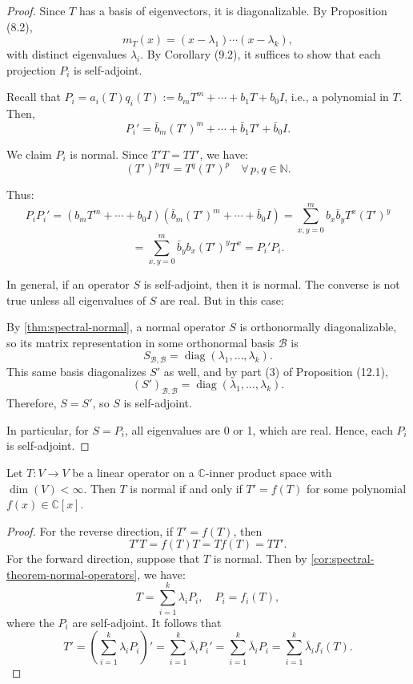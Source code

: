 \begin{proof} Since \( T \) has a basis of eigenvectors, it is diagonalizable. By Proposition (8.2),
\[
m_T(x) = (x - \lambda_1) \cdots (x - \lambda_k),
\]
with distinct eigenvalues \( \lambda_i \). By Corollary (9.2), it suffices to show that each projection \( P_i \) is self-adjoint.

Recall that \( P_i = a_i(T) q_i(T) := b_m T^m + \cdots + b_1 T + b_0 I \), i.e., a polynomial in \( T \). Then,
\[
P_i' = \bar{b}_m (T')^m + \cdots + \bar{b}_1 T' + \bar{b}_0 I.
\]

We claim \( P_i \) is normal. Since \( T'T = TT' \), we have:
\[
(T')^p T^q = T^q (T')^p \quad \forall\, p, q \in \mathbb{N}.
\]

Thus:
\[
P_i P_i' = \left( b_m T^m + \cdots + b_0 I \right) \left( \bar{b}_m (T')^m + \cdots + \bar{b}_0 I \right)
= \sum_{x,y=0}^m b_x \bar{b}_y T^x (T')^y
\]
\[
= \sum_{x,y=0}^m \bar{b}_y b_x (T')^y T^x = P_i' P_i.
\]

In general, if an operator \( S \) is self-adjoint, then it is normal. The converse is not true unless all eigenvalues of \( S \) are real. But in this case:

By \autoref{thm:spectral-normal}, a normal operator \( S \) is orthonormally diagonalizable, so its matrix representation in some orthonormal basis \( \mathcal{B} \) is
\[
S_{\mathcal{B}, \mathcal{B}} = \operatorname{diag}(\lambda_1, \ldots, \lambda_k).
\]
This same basis diagonalizes \( S' \) as well, and by part (3) of Proposition (12.1),
\[
(S')_{\mathcal{B}, \mathcal{B}} = \operatorname{diag}(\lambda_1, \ldots, \lambda_k).
\]
Therefore, \( S = S' \), so \( S \) is self-adjoint.

In particular, for \( S = P_i \), all eigenvalues are 0 or 1, which are real. Hence, each \( P_i \) is self-adjoint.
\end{proof}

\begin{corollary}
Let \( T : V \to V \) be a linear operator on a \( \mathbb{C} \)-inner product space with \( \dim(V) < \infty \). Then \( T \) is normal if and only if \( T' = f(T) \) for some polynomial \( f(x) \in \mathbb{C}[x] \).
\end{corollary}

\begin{proof} For the reverse direction, if \( T' = f(T) \), then
\[
T'T = f(T)T = Tf(T) = TT'.
\]
For the forward direction, suppose that \( T \) is normal. Then by \autoref{cor:spectral-theorem-normal-operators}, we have:
\[
T = \sum_{i=1}^k \lambda_i P_i, \quad P_i = f_i(T),
\]
where the \( P_i \) are self-adjoint. It follows that
\[
T' = \left( \sum_{i=1}^k \lambda_i P_i \right)' 
= \sum_{i=1}^k \bar{\lambda}_i P_i' 
= \sum_{i=1}^k \bar{\lambda}_i P_i 
= \sum_{i=1}^k \bar{\lambda}_i f_i(T).
\]
\end{proof}

